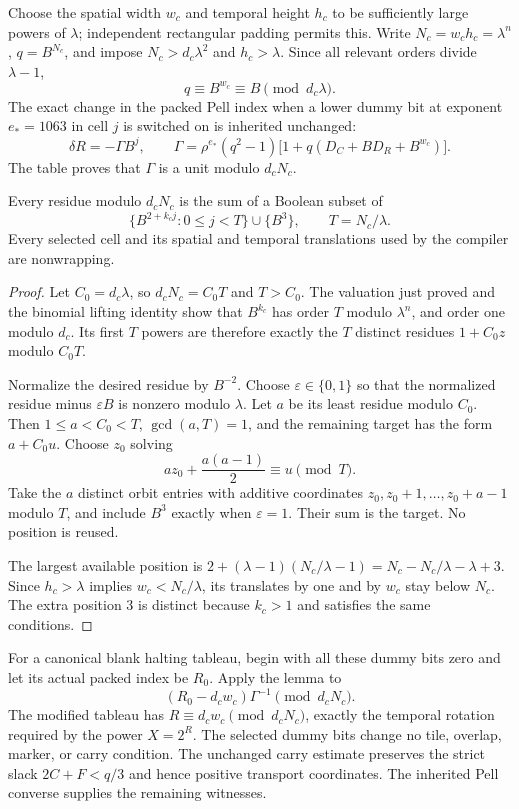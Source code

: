 Choose the spatial width $w_c$ and temporal height $h_c$ to be sufficiently
large powers of $\lambda$; independent rectangular padding permits this.
Write $N_c=w_ch_c=\lambda^n$, $q=B^{N_c}$, and impose
$N_c>d_c\lambda^2$ and $h_c>\lambda$.  Since all relevant orders divide
$\lambda-1$,
\[
 q\equiv B^{w_c}\equiv B\pmod{d_c\lambda}.
\]
The exact change in the packed Pell index when a lower dummy bit at
exponent $e_*=1063$ in cell $j$ is switched on is inherited unchanged:
\[
 \delta R=-\Gamma B^j,\qquad
 \Gamma=\rho^{e_*}(q^2-1)
        \bigl[1+q(D_C+BD_R+B^{w_c})\bigr].
\]
The table proves that $\Gamma$ is a unit modulo $d_cN_c$.

\begin{lemma}\label{lem:padding}
Every residue modulo $d_cN_c$ is the sum of a Boolean subset of
\[
 \{B^{2+k_cj}:0\le j<T\}\cup\{B^3\},\qquad T=N_c/\lambda.
\]
Every selected cell and its spatial and temporal translations used by the
compiler are nonwrapping.
\end{lemma}
\begin{proof}
Let $C_0=d_c\lambda$, so $d_cN_c=C_0T$ and $T>C_0$.
The valuation just proved and the binomial lifting identity show that
$B^{k_c}$ has order $T$ modulo $\lambda^n$, and order one modulo $d_c$.
Its first $T$ powers are therefore exactly the $T$ distinct residues
$1+C_0z$ modulo $C_0T$.

Normalize the desired residue by $B^{-2}$.  Choose
$\varepsilon\in\{0,1\}$ so that the normalized residue minus
$\varepsilon B$ is nonzero modulo $\lambda$.  Let $a$ be its least
residue modulo $C_0$.  Then $1\le a<C_0<T$, $\gcd(a,T)=1$, and the
remaining target has the form $a+C_0u$.  Choose $z_0$ solving
\[
 az_0+\frac{a(a-1)}2\equiv u\pmod T.
\]
Take the $a$ distinct orbit entries with additive coordinates
$z_0,z_0+1,\ldots,z_0+a-1$ modulo $T$, and include $B^3$ exactly when
$\varepsilon=1$.  Their sum is the target.  No position is reused.

The largest available position is
$2+(\lambda-1)(N_c/\lambda-1)=N_c-N_c/\lambda-\lambda+3$.
Since $h_c>\lambda$ implies $w_c<N_c/\lambda$, its translates by one
and by $w_c$ stay below $N_c$.  The extra position 3 is distinct because
$k_c>1$ and satisfies the same conditions.
\end{proof}

For a canonical blank halting tableau, begin with all these dummy bits
zero and let its actual packed index be $R_0$.  Apply the lemma to
\[
 (R_0-d_cw_c)\Gamma^{-1}\pmod{d_cN_c}.
\]
The modified tableau has
$R\equiv d_cw_c\pmod{d_cN_c}$, exactly the temporal rotation required
by the power $X=2^R$.  The selected dummy bits change no tile, overlap,
marker, or carry condition.  The unchanged carry estimate preserves
the strict slack $2C+F<q/3$ and hence positive transport coordinates.
The inherited Pell converse supplies the remaining witnesses.

